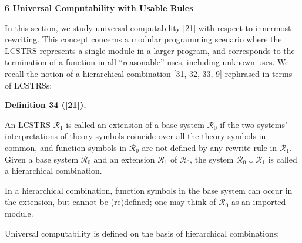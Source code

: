 \documentclass[10pt,a4paper]{amsart}
\begin{document}
 
 


 
\par\medskip\noindent\textbf{6 Universal Computability with Usable Rules}\par
 
 
In this section, we study universal computability [21] with respect to innermost rewriting. This concept concerns a modular programming scenario where the LCSTRS represents a single module in a larger program, and corresponds to the termination of a function in all “reasonable” uses, including unknown uses. We recall the notion of a hierarchical combination [31, 32, 33, 9] rephrased in terms of LCSTRSs:\par
 
 
 
\par\medskip\noindent\textbf{Definition 34 ([21]).}\par
 
 
An LCSTRS $\mathcal{R}_{1}$ is called an extension of a base system $\mathcal{R}_{0}$ if the two systems’ interpretations of theory symbols coincide over all the theory symbols in common, and function symbols in $\mathcal{R}_{0}$ are not defined by any rewrite rule in $\mathcal{R}_{1}$. Given a base system $\mathcal{R}_{0}$ and an extension $\mathcal{R}_{1}$ of $\mathcal{R}_{0}$, the system $\mathcal{R}_{0}\cup\mathcal{R}_{1}$ is called a hierarchical combination.\par
 
 
 
 
In a hierarchical combination, function symbols in the base system can occur in the extension, but cannot be (re)defined; one may think of $\mathcal{R}_{0}$ as an imported module.\par
 
 
 
Universal computability is defined on the basis of hierarchical combinations:\par
 
\end{document}
